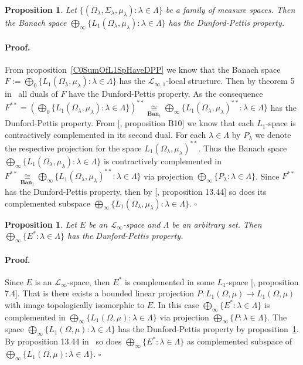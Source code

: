 \documentclass[12pt]{article}
\newcommand{\isom}[1]{\mathop{\mathbin{\cong}}\limits_{#1}}
\newtheorem{proposition}[theorem]{Proposition}
\renewenvironment{proof}{\paragraph{Proof.}}{\hfill$\square$\medskip}
\begin{document}
\begin{proposition}\label{ProdOfL1SpHaveDPP} Let
    $\{(\Omega_\lambda,\Sigma_\lambda,\mu_\lambda):\lambda\in\Lambda \}$ be a
    family of measure spaces. Then the Banach space
    $\bigoplus_\infty \{L_1(\Omega_\lambda,\mu_\lambda):\lambda\in\Lambda \}$
    has the Dunford-Pettis property.
\end{proposition}
\begin{proof} From proposition~\ref{C0SumOfL1SpHaveDPP} we know that the Banach
    space $F:=\bigoplus_0\{L_1(\Omega_\lambda,\mu_\lambda):\lambda\in\Lambda \}$
    has the $\mathcal{L}_{\infty,1}$-local structure. Then by theorem 5
    in~\cite{BourgOnTheDPP} all duals of $F$ have the Dunford-Pettis property.
    As the consequence
    $F^{**}={\left(\bigoplus_0
                \{L_1(\Omega_\lambda,\mu_\lambda):\lambda\in\Lambda \} \right)}^{**}
        \isom{\mathbf{Ban}_1} \bigoplus_\infty
        \{{L_1(\Omega_\lambda,\mu_\lambda)}^{**}:\lambda\in\Lambda \}$ has the
    Dunford-Pettis property. From [\cite{DefFloTensNorOpId}, proposition B10] we
    know that each $L_1$-space is contractively complemented in its second dual.
    For each $\lambda\in\Lambda$ by $P_\lambda$ we denote the respective
    projection for the space ${L_1(\Omega_\lambda,\mu_\lambda)}^{**}$. Thus the
    Banach space $\bigoplus_\infty
        \{L_1(\Omega_\lambda,\mu_\lambda):\lambda\in\Lambda \}$ is contractively
    complemented in $F^{**} \isom{\mathbf{Ban}_1} \bigoplus_\infty
        \{{L_1(\Omega_\lambda,\mu_\lambda)}^{**}:\lambda\in\Lambda \}$ via
    projection $\bigoplus_\infty \{P_\lambda:\lambda\in\Lambda \}$. Since
    $F^{**}$ has the Dunford-Pettis property, then by
        [\cite{FabHabBanSpTh}, proposition 13.44] so does its complemented subspace
    $\bigoplus_\infty \{L_1(\Omega_\lambda,\mu_\lambda):\lambda\in\Lambda \}$.
\end{proof}

\begin{proposition}\label{ProdOfDualsOfMthscrLInftySpHaveDPP} Let $E$ be an
    $\mathscr{L}_\infty$-space and $\Lambda$ be an arbitrary set. Then
    $\bigoplus_\infty \{E^*:\lambda\in\Lambda \}$ has the Dunford-Pettis
    property.
\end{proposition}
\begin{proof} Since $E$ is an $\mathscr{L}_\infty$-space, then $E^*$ is
    complemented in some $L_1$-space [\cite{LinPelAbsSumOpInLpSpAndApp},
    proposition 7.4]. That is there exists a bounded linear projection
    $P:L_1(\Omega,\mu)\to L_1(\Omega,\mu)$ with image topologically isomorphic
    to $E$. In this case $\bigoplus_\infty \{ E^*:\lambda\in\Lambda \}$ is
    complemented in $\bigoplus_\infty \{ L_1(\Omega,\mu):\lambda\in\Lambda \}$
    via projection $\bigoplus_\infty \{P:\lambda\in\Lambda \}$. The space
    $\bigoplus_\infty \{L_1(\Omega,\mu):\lambda\in\Lambda \}$ has the
    Dunford-Pettis property by proposition~\ref{ProdOfL1SpHaveDPP}. By
    proposition 13.44 in~\cite{FabHabBanSpTh} so does $\bigoplus_\infty
        \{E^*:\lambda\in\Lambda \}$ as complemented subspace of
    $\bigoplus_\infty \{L_1(\Omega,\mu):\lambda\in\Lambda \}$.
\end{proof}
\end{document}
